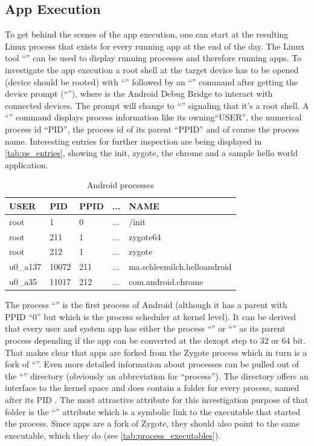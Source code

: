 \subsection{App Execution}\label{section:app_execution_detail}
To get behind the scenes of the app execution, one can start at
the resulting Linux process that exists for every running app at
the end of the day.
The Linux tool ``'' can be used to display
running processes and therefore running apps.
To investigate the app execution a root shell at the target device
has to be opened (device should be rooted) with ``''
followed by an ``'' command after getting the
device prompt (``''), where 
is the Android Debug Bridge to interact with connected devices.
The prompt will change to ``'' signaling
that it's a root shell. A ``'' command displays
process information like its owning``USER'', the numerical process id ``PID'',
the process id of its parent ``PPID'' and of course the process name.
Interesting entries for further inspection are being displayed in
\autoref{tab:ps_entries}, showing the init, zygote, the chrome and
a sample hello world application.

\begin{table}[htb]
  \caption[Android Processes]{Android processes}
  \label{tab:ps_entries}
  \centering
  \begin{tabular}{l l l l l}
    \toprule
      USER & PID & PPID & ... & NAME \\
    \midrule
      root & 1 & 0 & ... & /init \\
      root & 211 & 1 & ... & zygote64 \\
      root & 212 & 1 & ... & zygote \\
      u0\_a137 & 10072 & 211 & ... & ma.schleemilch.helloandroid \\
      u0\_a35 & 11017 & 212 & ... & com.android.chrome \\
    \bottomrule
  \end{tabular}
\end{table}

The process ``'' is the first process of Android (although
it has a parent with PPID ``0'' but which is the process scheduler at kernel
level).
It can be derived that every user and system app has either the process
``'' or ``'' as its parent process depending
if the app can be converted at the dexopt step to 32 or 64 bit.
That makes clear that apps are forked from the Zygote process which in turn
is a  fork of ``''.
Even more detailed information about processes can be
pulled out of the ``'' directory (obviously an abbreviation for
``process'').
The directory offers an interface to the kernel space and does contain a folder for every process, named after its PID \parencite{proc}. The most attractive attribute for this investigation purpose of that folder is the
``'' attribute which is a symbolic link to the executable that started the process. Since apps are a fork of Zygote, they should also point
to the same executable, which they do (see \autoref{tab:process_executables}).

